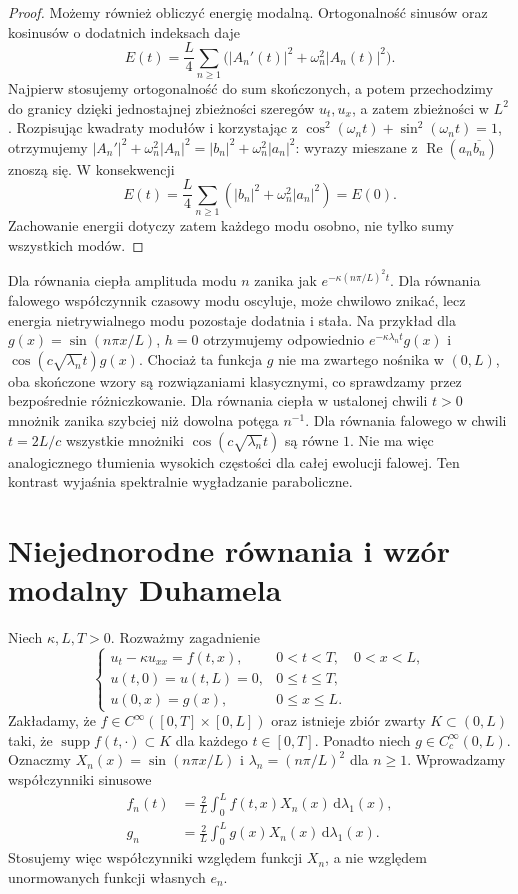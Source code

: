 \begin{proof}
Możemy również obliczyć energię modalną. Ortogonalność
sinusów oraz kosinusów o dodatnich indeksach daje
\[
 E(t)=\frac L4\sum_{n\ge1}
 \bigl(|A_n'(t)|^2+\omega_n^2|A_n(t)|^2\bigr).
\]
Najpierw stosujemy ortogonalność do sum skończonych,
a potem przechodzimy do granicy dzięki jednostajnej
zbieżności szeregów $u_t,u_x$, a zatem zbieżności w $L^2$.
Rozpisując kwadraty modułów i korzystając z
$\cos^2(\omega_nt)+\sin^2(\omega_nt)=1$, otrzymujemy
$|A_n'|^2+\omega_n^2|A_n|^2
=|b_n|^2+\omega_n^2|a_n|^2$:
wyrazy mieszane z $\operatorname{Re}(a_n\overline{b_n})$
znoszą się. W konsekwencji
\[
 E(t)=\frac L4\sum_{n\ge1}
 (|b_n|^2+\omega_n^2|a_n|^2)=E(0).
\]
Zachowanie energii dotyczy zatem każdego modu osobno,
nie tylko sumy wszystkich modów.
\end{proof}

\begin{przyklad}
\label{ex:pde6-smoothing}
Dla równania ciepła amplituda modu $n$ zanika jak
$e^{-\kappa(n\pi/L)^2t}$. Dla równania falowego
współczynnik czasowy modu oscyluje, może chwilowo
znikać, lecz energia nietrywialnego modu pozostaje
dodatnia i stała. Na przykład dla
$g(x)=\sin(n\pi x/L)$, $h=0$ otrzymujemy odpowiednio
$e^{-\kappa\lambda_nt}g(x)$ i
$\cos(c\sqrt{\lambda_n}t)g(x)$.
Chociaż ta funkcja $g$ nie ma zwartego nośnika w $(0,L)$,
oba skończone wzory są rozwiązaniami klasycznymi,
co sprawdzamy przez bezpośrednie różniczkowanie.
Dla równania ciepła w ustalonej chwili $t>0$
mnożnik zanika szybciej niż dowolna potęga $n^{-1}$.
Dla równania falowego w chwili $t=2L/c$ wszystkie
mnożniki $\cos(c\sqrt{\lambda_n}t)$ są równe $1$.
Nie ma więc analogicznego tłumienia wysokich
częstości dla całej ewolucji falowej. Ten kontrast
wyjaśnia spektralnie wygładzanie paraboliczne.
\end{przyklad}

\section{Niejednorodne równania i wzór modalny Duhamela}
\label{sec:pde6-forcing}

Niech $\kappa,L,T>0$. Rozważmy zagadnienie
\[
 \begin{cases}
 u_t-\kappa u_{xx}=f(t,x),&0<t<T,\quad 0<x<L,\\
 u(t,0)=u(t,L)=0,&0\le t\le T,\\
 u(0,x)=g(x),&0\le x\le L.
 \end{cases}
\]
Zakładamy, że $f\in C^\infty([0,T]\times[0,L])$
oraz istnieje zbiór zwarty $K\subset(0,L)$ taki, że
$\operatorname{supp}f(t,\cdot)\subset K$ dla każdego $t\in[0,T]$.
Ponadto niech $g\in C_c^\infty(0,L)$.
Oznaczmy $X_n(x)=\sin(n\pi x/L)$ i $\lambda_n=(n\pi/L)^2$
dla $n\ge1$. Wprowadzamy współczynniki sinusowe
\[
 \begin{aligned}
 f_n(t)&=\frac2L\int_0^L f(t,x)X_n(x)\,\mathrm d\lambda_1(x),\\
 g_n&=\frac2L\int_0^L g(x)X_n(x)\,\mathrm d\lambda_1(x).
 \end{aligned}
\]
Stosujemy więc współczynniki względem funkcji $X_n$,
a nie względem unormowanych funkcji własnych $e_n$.

